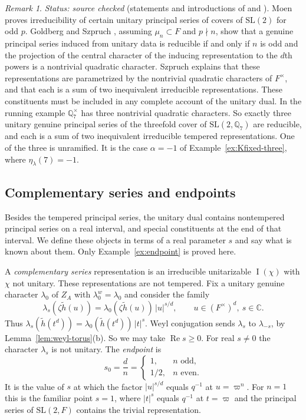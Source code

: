 \documentclass[12pt,letterpaper]{article}
\numberwithin{equation}{section}
\theoremstyle{plain}
\theoremstyle{definition}
\theoremstyle{remark}
\newcounter{uvc}
\newtheorem{uvremark}[uvc]{Remark}
\newcommand{\hl}{\tilde h}
\newcommand{\Cc}{\mathbb C}
\newcommand{\Qq}{\mathbb Q}
\newcommand{\ZA}{Z_A}
\DeclareMathOperator{\PI}{I}
\newcommand{\SL}{\mathrm{SL}}
\begin{document}
\begin{uvremark}\label{uv:reducible}
\emph{Status: source checked} (statements and introductions of
\cite{GS16} and \cite{Sz25}). Moen \cite{Mo88} proves irreducibility of
certain unitary principal series of covers of $\SL(2)$ for odd $p$.
Goldberg and Szpruch \cite[Thm.~5.2]{GS16}, assuming $\mu_n\subset F$
and $p\nmid n$, show that a genuine principal series induced from
unitary data is reducible if and only if $n$ is odd and the projection
of the central character of the inducing representation to the $d$th
powers is a nontrivial quadratic character. Szpruch \cite[\S3.1]{Sz25}
explains that these representations are parametrized by the nontrivial
quadratic characters of $F^\times$, and that each is a sum of two
inequivalent irreducible representations. These constituents must be
included in any complete account of the unitary dual. In the running
example $\Qq_7^\times$ has three nontrivial quadratic characters. So
exactly three unitary genuine principal series of the threefold cover
of $\SL(2,\Qq_7)$ are reducible, and each is a sum of two inequivalent
irreducible tempered representations. One of the three is unramified.
It is the case $\alpha=-1$ of Example~\ref{ex:Kfixed-three}, where
$\eta_\lambda(7)=-1$.
\end{uvremark}

\subsection{Complementary series and endpoints}\label{subsec:complementary}

Besides the tempered principal series, the unitary dual contains
nontempered principal series on a real interval, and special
constituents at the end of that interval. We define these objects in
terms of a real parameter $s$ and say what is known about them. Only
Example~\ref{ex:endpoint} is proved here.

A \emph{complementary series} representation is an irreducible
unitarizable $\PI(\chi)$ with $\chi$ not unitary. These representations
are not tempered. Fix a unitary genuine character $\lambda_0$ of $\ZA$
with $\lambda_0^w=\lambda_0$ and consider the family
\begin{equation}\label{eq:lambda-s}
\lambda_s(\zeta\hl(u))=\lambda_0(\zeta\hl(u))\,|u|^{s/d},
\qquad u\in(F^\times)^d,\ s\in\Cc .
\end{equation}
Thus $\lambda_s(\hl(t^d))=\lambda_0(\hl(t^d))\,|t|^{s}$. Weyl
conjugation sends $\lambda_s$ to $\lambda_{-s}$, by
Lemma~\ref{lem:weyl-torus}(b). So we may take
$\operatorname{Re}s\ge0$. For real $s\ne0$ the character $\lambda_s$ is
not unitary. The \emph{endpoint} is
\begin{equation}\label{eq:endpoint}
s_0=\frac dn=
\begin{cases}1,&n\text{ odd},\\[2pt] 1/2,&n\text{ even}.\end{cases}
\end{equation}
It is the value of $s$ at which the factor $|u|^{s/d}$ equals $q^{-1}$
at $u=\varpi^n$. For $n=1$ this is the familiar point $s=1$, where
$|t|^s$ equals $q^{-1}$ at $t=\varpi$ and the principal series of
$\SL(2,F)$ contains the trivial representation.
\end{document}
